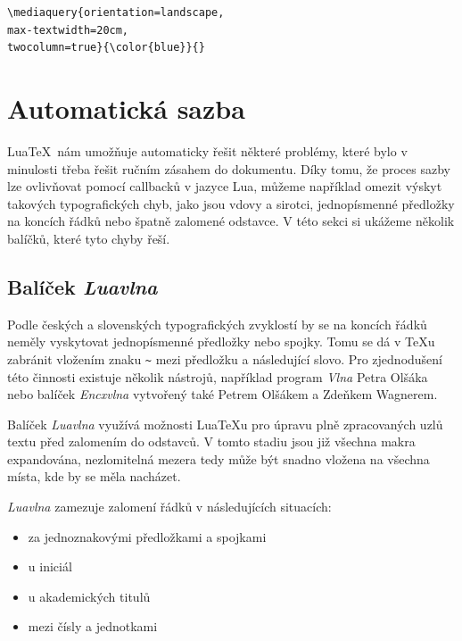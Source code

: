 \documentclass{csbulletin}
\newcommand\balicek[1]{\textit{#1}}
\begin{document}
\begin{verbatim}
\mediaquery{orientation=landscape,
max-textwidth=20cm,
twocolumn=true}{\color{blue}}{}
\end{verbatim}


\section{Automatická sazba}

Lua\TeX\ nám umožňuje automaticky řešit některé problémy, které bylo v
minulosti třeba řešit ručním zásahem do dokumentu. Díky tomu, že proces sazby
lze ovlivňovat pomocí callbacků v jazyce Lua, můžeme například omezit výskyt
takových typografických chyb, jako jsou vdovy a sirotci, jednopísmenné předložky
na koncích řádků nebo špatně zalomené odstavce. V této sekci si ukážeme
několik balíčků, které tyto chyby řeší.





\subsection{Balíček \balicek{Luavlna}}

Podle českých a slovenských typografických zvyklostí by se na koncích řádků
neměly vyskytovat jednopísmenné předložky nebo spojky. 
Tomu se dá v \TeX u zabránit vložením znaku \verb|~| mezi předložku a
následující slovo. Pro zjednodušení této činnosti existuje
několik nástrojů, například program \balicek{Vlna} Petra Olšáka nebo balíček
\balicek{Encxvlna} vytvořený také Petrem Olšákem a Zdeňkem Wagnerem.

Balíček \balicek{Luavlna} \cite{luavlna} využívá možnosti Lua\TeX u pro úpravu
plně zpracovaných uzlů textu před zalomením do odstavců. 
V tomto stadiu jsou již všechna makra expandována, nezlomitelná mezera
tedy může být snadno vložena na všechna místa, kde by se měla nacházet.

\balicek{Luavlna} zamezuje zalomení řádků v následujících situacích:

\begin{itemize}
  \item za jednoznakovými předložkami a spojkami
  \item u iniciál
  \item u akademických titulů
  \item mezi čísly a jednotkami
\end{itemize}
  
\end{document}
